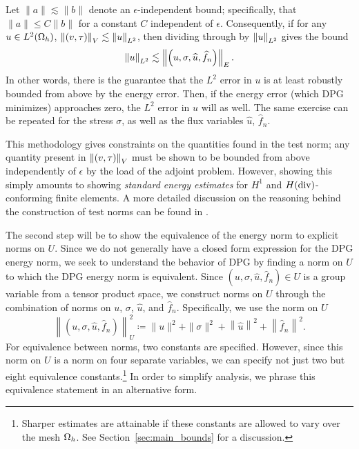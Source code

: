 Let $\|a\| \lesssim \|b\|$ denote an $\epsilon$-independent bound; specifically, that $\|a\| \leq C\|b\|$ for a constant $C$ independent of $\epsilon$. Consequently, if for any $u\in L^2(\Oh)$, $\nor{\left(v,\tau\right)}_V\lesssim \nor{u}_{L^2}$, then dividing through by $\nor{u}_{L^2}$ gives the bound
\[
 \nor{u}_{L^2} \lesssim \nor{\left(u,\sigma,\widehat{u},\widehat{f}_n\right)}_E.
\]
In other words, there is the guarantee that the $L^2$ error in $u$ is at least robustly bounded from above by the energy error. Then, if the energy error (which DPG minimizes) approaches zero, the $L^2$ error in $u$ will as well. The same exercise can be repeated for the stress $\sigma$, as well as the flux variables $\widehat{u}$, $\widehat{f}_n$. 

This methodology gives constraints on the quantities found in the test norm; any quantity present in $\nor{\left(v,\tau\right)}_V$ must be shown to be bounded from above independently of $\epsilon$ by the load of the adjoint problem. However, showing this simply amounts to showing \textit{standard energy estimates} for $H^1$ and $H({\rm div})$-conforming finite elements. A more detailed discussion on the reasoning behind the construction of test norms can be found in \cite{DPGrobustness}. 

The second step will be to show the equivalence of the energy norm to explicit norms on $U$. Since we do not generally have a closed form expression for the DPG energy norm, we seek to understand the behavior of DPG by finding a norm on $U$ to which the DPG energy norm is equivalent. Since $\left(u,\sigma,\widehat{u},\widehat{f}_n\right)\in U$ is a group variable from a tensor product space, we construct norms on $U$ through the combination of norms on $u$, $\sigma$, $\widehat{u}$, and $\widehat{f}_n$. Specifically, we use the norm on $U$ 
\begin{equation}
\left\| \left(u,\sigma,\widehat{u},\widehat{f}_n\right)\right \|_{U}^2 \coloneqq \|u\|^2 + \|\sigma\|^2 + \left\|\widehat{u}\right\|^2 + \left\|\widehat{f}_n\right\|^2.
\end{equation}
For equivalence between norms, two constants are specified. However, since this norm on $U$ is a norm on four separate variables, we can specify not just two but eight equivalence constants.\footnote{Sharper estimates are attainable if these constants are allowed to vary over the mesh $\Oh$. See Section~\ref{sec:main_bounds} for a discussion.} In order to simplify analysis, we phrase this equivalence statement in an alternative form. 

